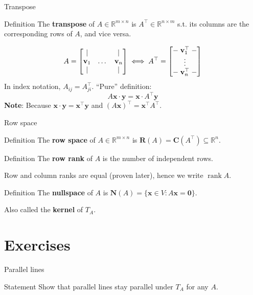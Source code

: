 \documentclass[10pt]{beamer}
\begin{document}
\begin{frame}{Transpose}
    \begin{block}{Definition}
        The \textbf{transpose} of $A \in \mathbb R^{m \times n}$ is $A^\top \in \mathbb R^{n \times m}$ s.t. its columns are the corresponding rows of $A$, and vice versa.
    \end{block}
    $$
    A = \begin{bmatrix}
        | &   & | \\
        \mathbf v_1 & \dots & \mathbf v_n \\
        | &   & |
    \end{bmatrix}
    \iff
    A^\top =
    \begin{bmatrix}
        \relbar\mathbf  v_1^\top\relbar \\
        \vdots \\
        \relbar\mathbf v_n^\top\relbar
    \end{bmatrix}
    $$
    In index notation, $A_{ij} = A^\top _{ji}$. ``Pure'' definition:
    $$
    A \mathbf x \cdot \mathbf y = \mathbf x \cdot A^\top \mathbf y
    $$
    \textbf{Note}: Because $\mathbf x \cdot \mathbf y = \mathbf x ^\top \mathbf y$ and $(A \mathbf x)^\top = \mathbf x^\top A^\top$.
\end{frame}
\begin{frame}{Row space}
    \begin{block}{Definition}
        The \textbf{row space} of $A \in \mathbb R^{m \times n}$ is $\mathbf R(A) = \mathbf C(A^\top) \subseteq \mathbb R^n$.
    \end{block}
    \begin{block}{Definition}
        The \textbf{row rank} of $A$ is the number of independent rows.
    \end{block}
    Row and column ranks are equal (proven later), hence we write $\operatorname{rank} A$.
    
    \begin{block}{Definition}
        The \textbf{nullspace} of $A$ is $\mathbf N(A) = \{\mathbf x \in V : A \mathbf x = \mathbf 0\}$.
    \end{block}
    Also called the \textbf{kernel} of $T_A$.
\end{frame}

\section{Exercises}
\begin{frame}{Parallel lines}
    \begin{block}{Statement}
        Show that parallel lines stay parallel under $T_A$ for any $A$.
    \end{block}
\end{frame}
\end{document}

